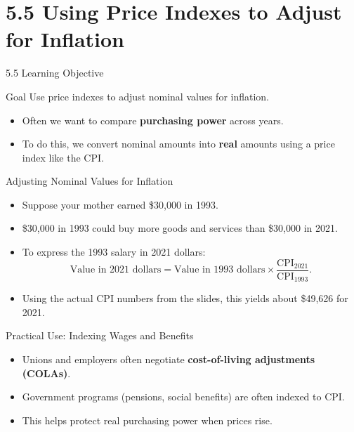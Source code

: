 \documentclass[aspectratio=169]{beamer}
\begin{document}
\section{5.5 Using Price Indexes to Adjust for Inflation}

\begin{frame}{5.5 Learning Objective}
\transfade
\begin{block}{Goal}
Use price indexes to adjust nominal values for inflation.
\end{block}
\begin{itemize}[<+->]
  \item Often we want to compare \textbf{purchasing power} across years.
  \item To do this, we convert nominal amounts into \textbf{real} amounts using a price index like the CPI.
\end{itemize}
\end{frame}

\begin{frame}{Adjusting Nominal Values for Inflation}
\transfade
\begin{itemize}[<+->]
  \item Suppose your mother earned \$30,000 in 1993.
  \item \$30,000 in 1993 could buy more goods and services than \$30,000 in 2021.
  \item To express the 1993 salary in 2021 dollars:
  \[
    \text{Value in 2021 dollars} =
    \text{Value in 1993 dollars} \times
    \frac{\text{CPI}_{2021}}{\text{CPI}_{1993}}.
  \]
  \item Using the actual CPI numbers from the slides, this yields about \$49,626 for 2021.
\end{itemize}
\end{frame}

\begin{frame}{Practical Use: Indexing Wages and Benefits}
\transfade
\begin{itemize}[<+->]
  \item Unions and employers often negotiate \textbf{cost-of-living adjustments (COLAs)}.
  \item Government programs (pensions, social benefits) are often indexed to CPI.
  \item This helps protect real purchasing power when prices rise.
\end{itemize}
\end{frame}
\end{document}
